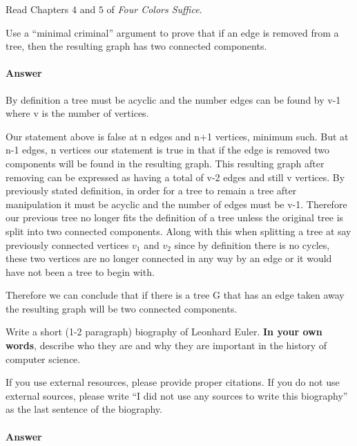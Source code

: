 \documentclass{article}
\begin{document}
Read Chapters $4$ and $5$ of \emph{Four Colors Suffice}.

Use a ``minimal criminal'' argument to prove that if an edge is removed from a
tree, then the resulting graph has two connected components.

\paragraph{Answer}
By definition a tree must be acyclic and the number edges can be found by v-1
where v is the number of vertices.

Our statement above is false at n edges and n+1 vertices, minimum such. But at
n-1 edges, n vertices our statement is true in that if the edge is removed two components will
be found in the resulting graph. This resulting graph after removing can be
expressed as having a total of v-2 edges and still v vertices. By previously
stated definition, in order for a tree to remain a tree after manipulation it must
be acyclic and the number of edges must be v-1. Therefore our previous tree no
longer fits the definition of a tree unless the original tree is split into two
connected components. Along with this when splitting a tree at say previously
connected vertices $v_1$ and $v_2$ since by definition there is no cycles, these
two vertices are no longer connected in any way by an edge or it would have not
been a tree to begin with.

Therefore we can conclude that if there is a tree G that has an edge taken away
the resulting graph will be two connected components.



Write a short (1-2 paragraph) biography of Leonhard Euler.
\textbf{In your own words}, describe who they are and why they are important in
the history of computer science.

If you use external resources, please provide
proper citations. If you do not use external sources, please write ``I did not
use any sources to write this biography'' as the last sentence of the
biography.

\paragraph{Answer}
\end{document}
